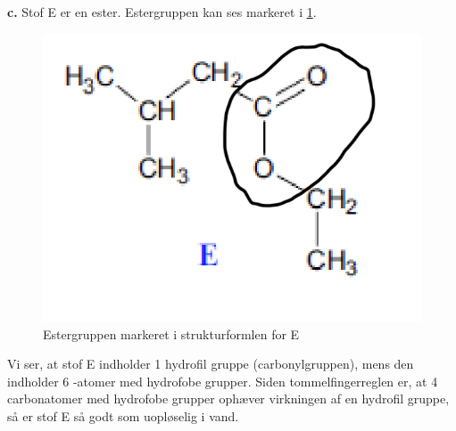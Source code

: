 \documentclass{report}
\begin{document}
\textbf{c.} 
Stof E er en ester. 
Estergruppen kan ses markeret i \cref{fig:E}.
\begin{figure}[H]
\begin{center}
  \includegraphics[scale=1]{E.png}
\end{center}
\caption{Estergruppen markeret i strukturformlen for E}
\label{fig:E}
\end{figure}
Vi ser, at stof E indholder 1 hydrofil gruppe (carbonylgruppen), mens den indholder 6 -atomer med hydrofobe grupper.
Siden tommelfingerreglen er, at 4 carbonatomer med hydrofobe grupper ophæver virkningen af en hydrofil gruppe, så er stof E så godt som uopløselig i vand.
\end{document}
